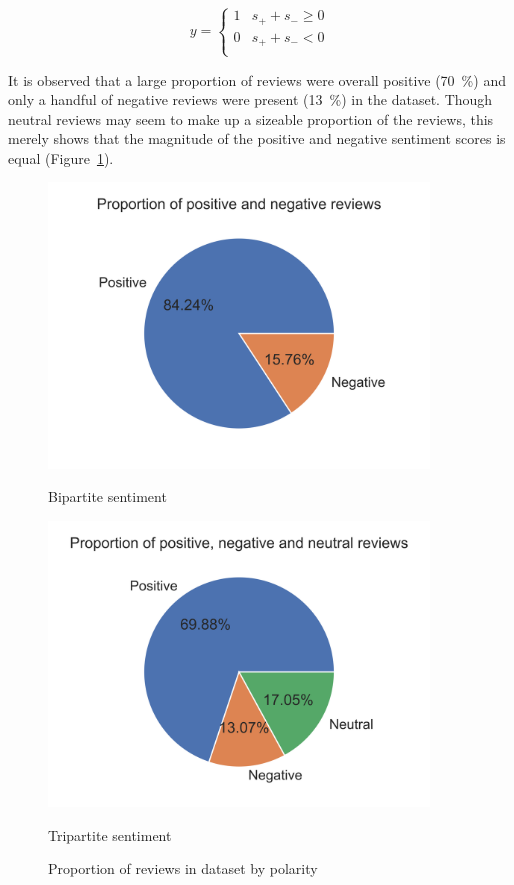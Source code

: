 \documentclass[12pt, a4paper]{pancake-article}
\begin{document}
\begin{equation}
	y = \begin{cases}
		1 & s_+ + s_- \geq 0 \\
		0 & s_+ + s_- < 0    \\
	\end{cases}
	\label{eq:polarity}
\end{equation}

It is observed that a large proportion of reviews were overall positive (\qty{70}{\percent})
and only a handful of negative reviews were present (\qty{13}{\percent}) in the dataset.
Though neutral reviews may seem to make up a sizeable proportion of the reviews, this merely
shows that the magnitude of the positive and negative sentiment scores is equal (Figure~\ref{fig:pies}).

\begin{figure}[htpb]
	\centering
	\begin{minipage}{0.5\textwidth}
		\centering
		\includegraphics[width=0.9\textwidth]{../results/old/pie_bipartite.png}
		\caption*{Bipartite sentiment}
	\end{minipage}\hfill
	\begin{minipage}{0.5\textwidth}
		\centering
		\includegraphics[width=0.9\textwidth]{../results/old/pie_tripartite.png}
		\caption*{Tripartite sentiment}
	\end{minipage}
	\caption{Proportion of reviews in dataset by polarity}
	\label{fig:pies}
\end{figure}
\end{document}
